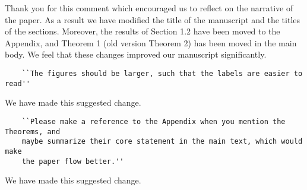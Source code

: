 \documentclass{article}
\begin{document}
Thank you for this comment which encouraged us to reflect on the narrative of the
paper. As a result we have modified the title of the manuscript and the titles
of the sections. Moreover, the results of Section 1.2 have been moved to the Appendix,
and Theorem 1 (old version Theorem 2) has been moved in the main body.
We feel that these changes improved our manuscript significantly.

\begin{verbatim}
    ``The figures should be larger, such that the labels are easier to read''
\end{verbatim}

We have made this suggested change.

\begin{verbatim}
    ``Please make a reference to the Appendix when you mention the Theorems, and
    maybe summarize their core statement in the main text, which would make
    the paper flow better.''
\end{verbatim}

We have made this suggested change.
\end{document}
